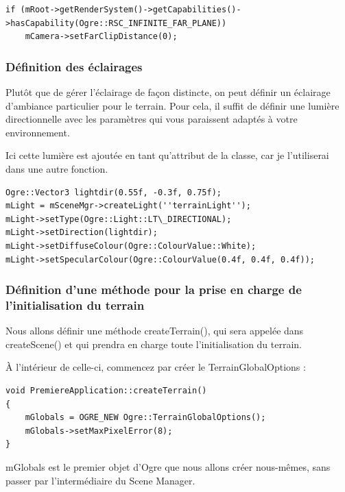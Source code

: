 \begin{lstlisting}[caption={V\'erification et r\'eglages de vue \`a l'infini}]
if (mRoot->getRenderSystem()->getCapabilities()->hasCapability(Ogre::RSC_INFINITE_FAR_PLANE))
    mCamera->setFarClipDistance(0);
\end{lstlisting}




\subsubsection{D\'efinition des \'eclairages}
Plut\^ot que de g\'erer l'\'eclairage de fa\c{c}on distincte, on peut d\'efinir un \'eclairage d'ambiance particulier pour le terrain. Pour cela, il suffit de d\'efinir une lumi\`ere directionnelle avec les param\`etres qui vous paraissent adapt\'es \`a votre environnement. 

Ici cette lumi\`ere est ajout\'ee en tant qu'attribut de la classe, car je l'utiliserai dans une autre fonction.

\begin{lstlisting}[caption={D\'efinition de l'\'eclairage pour le terrain}]
Ogre::Vector3 lightdir(0.55f, -0.3f, 0.75f);
mLight = mSceneMgr->createLight(''terrainLight'');
mLight->setType(Ogre::Light::LT\_DIRECTIONAL);
mLight->setDirection(lightdir);
mLight->setDiffuseColour(Ogre::ColourValue::White);
mLight->setSpecularColour(Ogre::ColourValue(0.4f, 0.4f, 0.4f));
\end{lstlisting}




\subsubsection{D\'efinition d'une m\'ethode pour la prise en charge de l'initialisation du terrain}

Nous allons d\'efinir une m\'ethode createTerrain(), qui sera appel\'ee dans createScene() et qui prendra en charge toute l'initialisation du terrain.

\`A l'int\'erieur de celle-ci, commencez par cr\'eer le TerrainGlobalOptions :

\begin{lstlisting}[caption={M\'ethode pour la prise en charge de l'initialisation du terrain}]
void PremiereApplication::createTerrain()
{
    mGlobals = OGRE_NEW Ogre::TerrainGlobalOptions();
    mGlobals->setMaxPixelError(8);
}
\end{lstlisting}

mGlobals est le premier objet d'Ogre que nous allons cr\'eer nous-m\^emes, sans passer par l'interm\'ediaire du Scene Manager.

